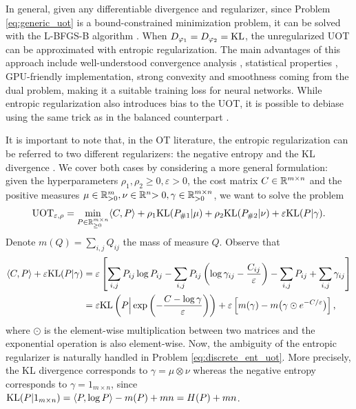 In general, given any differentiable divergence and regularizer, since Problem \ref{eq:generic_uot}
is a bound-constrained minimization problem, it can be solved with the L-BFGS-B algorithm
\citep{Byrd95,Zhu97}. When $D_{\varphi_1} = D_{\varphi_2} = \text{KL}$, the unregularized UOT can
be approximated with entropic regularization. The main advantages of this approach include
well-understood convergence analysis \citep{Chizat18a}, statistical properties \citep{Sejourne19},
GPU-friendly implementation, strong convexity and smoothness coming from the dual problem,
making it a suitable training loss for neural networks.
While entropic regularization also introduces bias to the UOT, it is possible to debiase
using the same trick as in the balanced counterpart \citep{Sejourne19}.

It is important to note that, in the OT literature, the entropic regularization
can be referred to two different regularizers: the negative entropy \citep{Frogner15, Chizat18a} and
the KL divergence \citep{Sejourne19}. We cover both cases by considering a
more general formulation: given the hyperparameters
$\rho_1, \rho_2 \geq 0, \varepsilon > 0$, the cost matrix $C \in \mathbb R^{m \times n}$
and the positive measures $\mu \in \mathbb R^m_{> 0}, \nu \in \mathbb R^n{> 0}, \gamma \in \mathbb R^{m \times n}_{> 0}$,
we want to solve the problem
\begin{align}
  \label{eq:discrete_ent_uot}
  \text{UOT}_{\varepsilon, \rho} = \min_{P \in \mathbb R^{m \times n}_{\geq 0}} \langle C, P \rangle + \rho_1 \text{KL}(P_{\# 1} | \mu)
  + \rho_2 \text{KL}(P_{\# 2} | \nu) + \varepsilon \text{KL}(P | \gamma).
\end{align}
Denote $m(Q) = \sum_{i, j} Q_{ij}$ the mass of measure $Q$. Observe that
\begin{align}
  \langle C, P \rangle + \varepsilon \text{KL}(P | \gamma) &=
  \varepsilon \left[ \sum_{i, j} P_{ij} \log P_{ij} -
  \sum_{i, j} P_{ij} \left( \log \gamma_{ij} - \frac{C_{ij}}{\varepsilon} \right)
  - \sum_{i, j} P_{ij} + \sum_{i, j} \gamma_{ij} \right] \\
  &= \varepsilon \text{KL} \left(P \Big| \exp \left( -\frac{C - \log \gamma}{\varepsilon} \right) \right)
  + \varepsilon \left[ m(\gamma) - m \big(\gamma \odot e^{-C / \varepsilon} \big) \right],
\end{align}
where $\odot$ is the element-wise multiplication between two matrices and the exponential operation
is also element-wise. Now, the ambiguity of the entropic regularizer is naturally handled in
Problem \ref{eq:discrete_ent_uot}. More precisely,
the KL divergence corresponds to $\gamma = \mu \otimes \nu$ whereas
the negative entropy corresponds to $\gamma = 1_{m \times n}$,
since $\text{KL}(P | 1_{m \times n}) = \langle P, \log P \rangle - m(P) + mn = H(P) + mn$.

